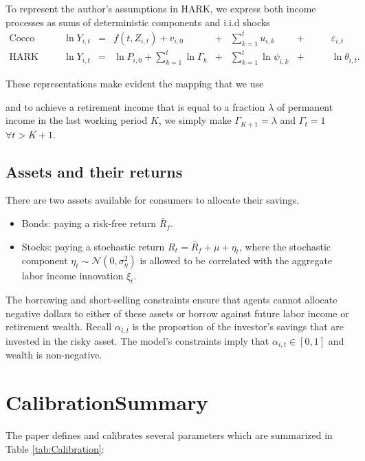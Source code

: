 \documentclass[./CGMPortfolio.tex]{subfiles}
\begin{document}
To represent the author's assumptions in HARK, we express both income processes as sums of deterministic components and i.i.d shocks
\begin{align}
\text{Cocco et. al} &\quad& \ln Y_{i,t} &=& f(t,Z_{i,t}) + v_{i,0} &+&\sum_{k=1}^t u_{i,k} &+&\qquad \varepsilon_{i,t} \\
\text{HARK}        &\quad& \ln Y_{i,t} &=& \ln P_{i,0} + \sum_{k=1}^t \ln \Gamma_k &+&\sum_{k=1}^t \ln \psi_{i,k} &+& \qquad \ln \theta_{i,t}.
\end{align}

These representations make evident the mapping that we use

and to achieve a retirement income that is equal to a fraction $\lambda$ of 
permanent income in the last working period $K$, we simply make $\Gamma_{K+1} = 
\lambda$ and $\Gamma_{t} = 1$ $\forall t>K+1$.

\subsection{Assets and their returns}

There are two assets available for consumers to allocate their savings.
\begin{itemize}
	\item Bonds: paying a risk-free return $\bar{R}_f$.

	\item Stocks: paying a stochastic return $R_t = \bar{R}_f + \mu + \eta_t$, where the stochastic component $\eta_t \sim \mathcal{N}(0, \sigma^2_\eta)$ is allowed to be correlated with the aggregate labor income innovation $\xi_t$.
	
\end{itemize}

The borrowing and short-selling constraints ensure that agents cannot allocate negative dollars to either of these assets or borrow against future labor income or retirement wealth. Recall $\alpha_{i,t}$ is the proportion of the investor's savings that are invested in the risky asset. The model's constraints imply that $\alpha_{i,t}\in[0,1]$ and wealth is non-negative.

\hypertarget{Calibration}{}
\section{Calibration\textemdash Summary}

The paper defines and calibrates several parameters which are summarized in Table \ref{tab:Calibration}:
\end{document}
